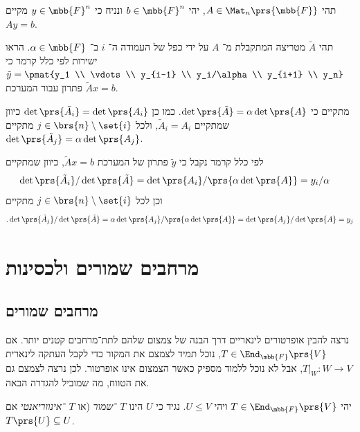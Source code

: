 \documentclass[a4paper,10pt,twoside,openany]{book}
\begin{document}
\begin{exercisechap}
תהי
$A \in \Mat_n\prs{\mbb{F}}$,
יהי
$b \in \mbb{F}^n$
ונניח כי
$y \in \mbb{F}^n$
מקיים
$Ay = b$.

תהי
$\tilde{A}$
מטריצה המתקבלת מ־%
$A$
על ידי כפל של העמודה ה־%
$i$
ב־%
$\alpha \in\mbb{F}$.
הראו ישירות לפי כלל קרמר כי
$\tilde{y} = \pmat{y_1 \\ \vdots \\ y_{i-1} \\ y_i/\alpha \\ y_{i+1} \\ y_n}$
פתרון עבור המערכת
$\tilde{A}x = b$.
\end{exercisechap}

\begin{solution}
מתקיים כי
$\det\prs{\tilde{A}} = \alpha \det\prs{A}$.
כמו כן
$\det\prs{\tilde{A}_i} = \det\prs{A_i}$
כיוון שמתקיים
$\tilde{A}_i = A_i$,
ולכל
$j \in \brs{n} \setminus \set{i}$
מתקיים
$\det\prs{\tilde{A}_j} = \alpha \det\prs{A_j}$.

לפי כלל קרמר נקבל כי
$\tilde{y}$
פתרון של המערכת
$\tilde{A} x = b$,
כיוון שמתקיים
\begin{align*}
\det\prs{\tilde{A}_i} / \det\prs{\tilde{A}} &= \det\prs{A_i} / \prs{\alpha \det\prs{A}} = y_i / \alpha
\end{align*}
וכן לכל
$j \in \brs{n} \setminus \set{i}$
מתקיים
\begin{align*}
\text{.} \det\prs{\tilde{A}_j} / \det\prs{\tilde{A}} = \alpha \det\prs{A_j} / \prs{\alpha \det\prs{A}} = \det\prs{A_j} / \det\prs{A} = y_j
\end{align*}
\end{solution}

\chapter{מרחבים שמורים ולכסינות}

\section{מרחבים שמורים}

נרצה להבין אופרטורים לינאריים דרך הבנה של צמצום שלהם לתת־מרחבים קטנים יותר.
אם
$T \in \End_{\mbb{F}}\prs{V}$,
נוכל תמיד לצמצם את המקור כדי לקבל העתקה לינארית
$\left. T \right|_{W} \colon W \to V$,
אבל לא נוכל ללמוד מספיק כאשר הצמצום אינו אופרטור. לכן נרצה לצמצם גם את הטווח, מה שמוביל להגדרה הבאה.

\begin{definition}
יהי
$T \in \End_{\mbb{F}}\prs{V}$
ויהי
$U \leq V$.
נגיד כי
$U$
הינו
\emph{$T$%
־שמור} (או
\emph{$T$%
־אינווריאנטי}
אם
$T\prs{U} \subseteq U$.
\end{definition}
\end{document}
